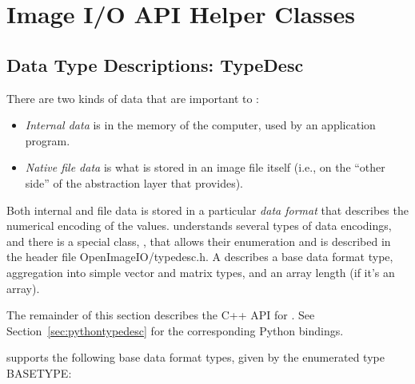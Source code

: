 \chapter{Image I/O API Helper Classes}
\label{chap:imageioapi}



\section{Data Type Descriptions: {\cf TypeDesc}}
\label{sec:dataformats}
\label{sec:TypeDesc}

There are two kinds of data that are important to \product:

\begin{itemize}
\item \emph{Internal data} is in the memory of the computer, used by an
  application program.
\item \emph{Native file data} is what is stored in an image file itself
  (i.e., on the ``other side'' of the abstraction layer that \product
  provides).
\end{itemize}

Both internal and file data is stored in a particular \emph{data format}
that describes the numerical encoding of the values.  \product
understands several types of data encodings, and there is 
a special class, \TypeDesc, that allows their enumeration and
is described in the header file {\cf OpenImageIO/typedesc.h}.
A \TypeDesc describes a base data format type, aggregation into simple
vector and matrix types, and an array length (if
it's an array).

The remainder of this section describes the C++ API for \TypeDesc.
See Section~\ref{sec:pythontypedesc} for the corresponding Python
bindings.

\TypeDesc supports the following base data format types, given by the
enumerated type {\cf BASETYPE}:

\medskip


